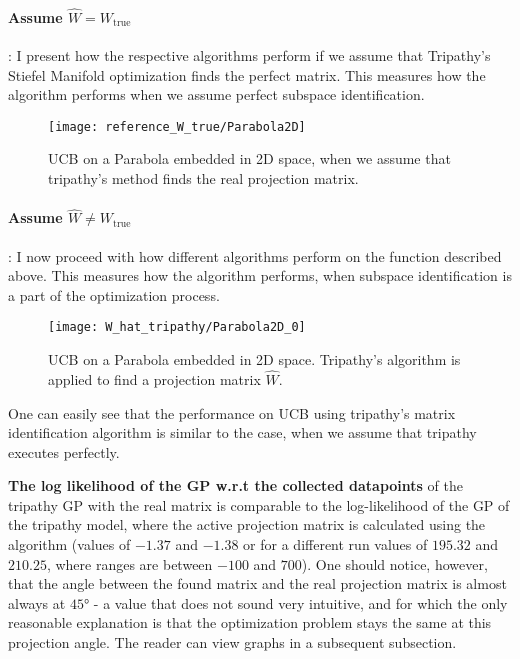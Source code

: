 \paragraph{Assume $\hat{W} = W_{\text{true}}$}: I present how the respective algorithms perform if we assume that Tripathy's Stiefel Manifold optimization finds the perfect matrix.
This measures how the algorithm performs when we assume perfect subspace identification.

\begin{figure}[H]
  \centering
      \texttt{[image: reference\_W\_true/Parabola2D]}
  \caption{UCB on a Parabola embedded in 2D space, when we assume that tripathy's method finds the real projection matrix.}
\end{figure}

\paragraph{Assume $\hat{W} \neq W_{\text{true}}$}: I now proceed with how different algorithms perform on the function described above.
This measures how the algorithm performs, when subspace identification is a part of the optimization process.

\begin{figure}[H]
  \centering
      \texttt{[image: W\_hat\_tripathy/Parabola2D\_0]}
  \caption{UCB on a Parabola embedded in 2D space.
  Tripathy's algorithm is applied to find a projection matrix $\hat{W}$.}
\end{figure}

One can easily see that the performance on UCB using tripathy's matrix identification algorithm is similar to the case, when we assume that tripathy executes perfectly.



\textbf{The log likelihood of the GP w.r.t the collected datapoints} of the tripathy GP with the real matrix is comparable to the log-likelihood of the GP of the tripathy model, where the active projection matrix is calculated using the algorithm (values of $-1.37$ and $-1.38$ or for a different run values of $195.32$ and $210.25$, where ranges are between  $-100$ and $700$).
One should notice, however, that the angle between the found matrix and the real projection matrix is almost always at $45°$ - a value that does not sound very intuitive, and for which the only reasonable explanation is that the optimization problem stays the same at this projection angle.
The reader can view graphs in a subsequent subsection.

